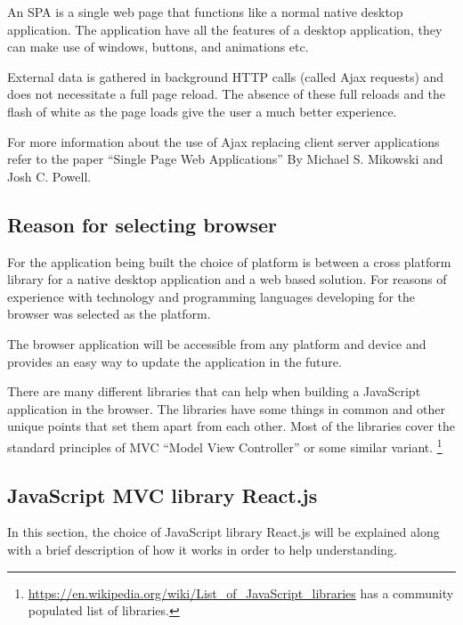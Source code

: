 An SPA is a single web page that functions like a normal native desktop
application. The application have all the features of a desktop application,
they can make use of windows, buttons, and animations etc.

External data is gathered in background HTTP calls (called Ajax
requests) and does not necessitate a full page reload. The absence of
these full reloads and the flash of white as the page loads give the
user a much better experience.

For more information about the use of Ajax replacing client server applications
refer to the paper ``Single Page Web Applications'' By Michael S. Mikowski and Josh C.
Powell\cite{garrett2005ajax}.

\subsection{Reason for selecting browser}\label{reason-for-selecting-browser}

For the application being built the choice of platform is between a
cross platform library for a native desktop application and a web based
solution. For reasons of experience with technology and programming
languages developing for the browser was selected as the platform.

The browser application will be accessible from any platform and device
and provides an easy way to update the application in the future.

There are many different libraries that can help when building a JavaScript
application in the browser. The libraries have some things in common and other
unique points that set them apart from each other. Most of the libraries cover
the standard principles of MVC ``Model View Controller'' or some similar
variant. \footnote{
\href{https://en.wikipedia.org/wiki/List_of_JavaScript_libraries\#Web-application_related_.28MVC.2C_MVVM.29}%
{https://en.wikipedia.org/wiki/List\_of\_JavaScript\_libraries}
has a community populated list of libraries.}

\subsection{JavaScript MVC library React.js}\label{javascript-mvc-library-react.js}

In this section, the choice of JavaScript library React.js will be explained
along with a brief description of how it works in order to help understanding.

